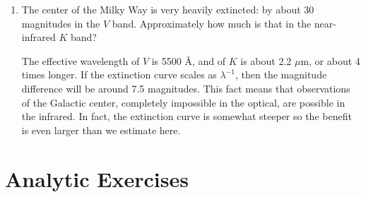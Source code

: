 \begin{enumerate}
\item The center of the Milky Way is very heavily extincted: by about
    30 magnitudes in the $V$ band. Approximately how much is that in
    the near-infrared $K$ band?

\begin{answer}
The effective wavelength of $V$ is 5500 {\AA}, and of $K$ is about 2.2
  $\mu$m, or about 4 times longer. If the extinction curve scales as
  $\lambda^{-1}$, then the magnitude difference will be around 7.5
  magnitudes. This fact means that observations of the Galactic
  center, completely impossible in the optical, are possible in the
  infrared.  In fact, the extinction curve is somewhat steeper so the
  benefit is even larger than we estimate here.
\end{answer}

\end{enumerate}   

\section{Analytic Exercises}

